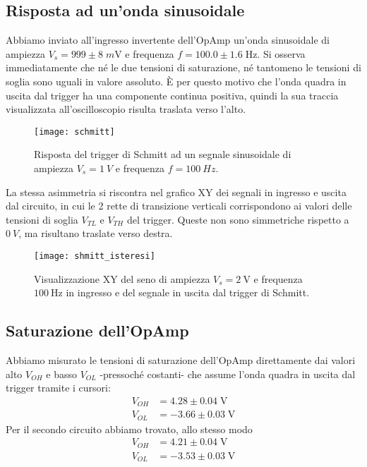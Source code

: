 \documentclass[10pt, a4paper, italian]{article}
\begin{document}
\subsection{Risposta ad un'onda sinusoidale}
Abbiamo inviato all'ingresso invertente dell'OpAmp un'onda sinusoidale di
ampiezza $V_s = 999 \pm 8 \; \si{m\V}$ e frequenza $f = 100.0 \pm 1.6 \; \si{\Hz}$.
Si osserva immediatamente che né le due tensioni di saturazione, né tantomeno
le tensioni di soglia sono uguali in valore assoluto. \`E per questo motivo
che l'onda quadra in uscita dal trigger ha una componente continua positiva,
quindi la sua traccia visualizzata all'oscilloscopio risulta traslata verso
l'alto.
\begin{figure}[htbp]
	\centering
	\texttt{[image: schmitt]}
	\caption{Risposta del trigger di Schmitt ad un segnale sinusoidale di ampiezza
	$V_s = \SI{1}{V}$ e frequenza $f = \SI{100}{Hz}$. \label{fig: schmittsine}}
\end{figure}

La stessa asimmetria si riscontra nel grafico XY dei segnali in ingresso e
uscita dal circuito, in cui le 2 rette di transizione verticali corrispondono
ai valori delle tensioni di soglia $V_{TL}$ e $V_{TH}$ del trigger. Queste
non sono simmetriche rispetto a $\SI{0}{V}$, ma risultano traslate verso
destra.
\begin{figure}[htbp]
	\centering
	\texttt{[image: shmitt\_isteresi]}
	\caption{Visualizzazione XY del seno di ampiezza $V_s = \SI{2}{\V}$ e
	frequenza $\SI{100}{\Hz}$ in ingresso e del segnale in uscita dal trigger di
	Schmitt. \label{fig: schmittxy}}
\end{figure}

\subsection{Saturazione dell'OpAmp}
Abbiamo misurato le tensioni di saturazione dell'OpAmp direttamente
dai valori alto $V_{OH}$ e basso $V_{OL}$ -pressoché costanti- che assume
l'onda quadra in uscita dal trigger tramite i cursori:
\begin{align*}
V_{OH} &= 4.28 \pm 0.04 \; \si{\V} \\
V_{OL} &= -3.66 \pm 0.03 \; \si{\V}
\end{align*}
Per il secondo circuito abbiamo trovato, allo stesso modo
\begin{align*}
V_{OH} &= 4.21 \pm 0.04 \; \si{\V} \\
V_{OL} &= -3.53 \pm 0.03 \; \si{\V}
\end{align*}
\end{document}

